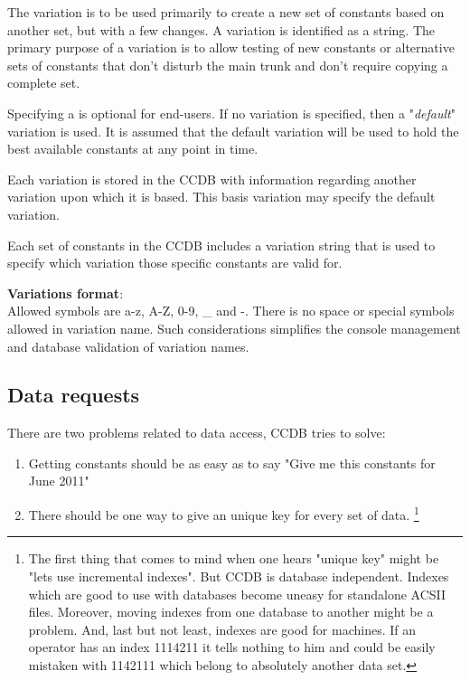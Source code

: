 \documentclass{article}
\begin{document}
The variation is to be used primarily to create a new set of constants based
on another set, but with a few changes. A variation is identified as a string.
The primary purpose of a variation is to allow testing of new constants or
alternative sets of constants that don't disturb the main trunk and don't
require copying a complete set.

Specifying a is optional for end-users. If no variation is specified, then a
"\textit{default}" variation is used. It is assumed that the default variation
will be used to hold the best available constants at any point in time.

Each variation is stored in the CCDB with information regarding another
variation upon which it is based. This basis variation may specify the default variation.

Each set of constants in the CCDB includes a variation string that is used to
specify which variation those specific constants are valid for.

\textbf{Variations format}:\\
Allowed symbols are a-z, A-Z, 0-9, \_ and -. There is no space or special symbols
allowed in variation name. Such considerations simplifies the console management
and database validation of variation names.


\subsection{Data requests}

There are two problems related to data access, CCDB tries to solve:
\begin{enumerate}
  \item Getting constants should be as easy as to say
        "Give me this constants for June 2011"

  \item There should be one way to give an unique key for every set of data.
  \footnote{
    The first thing that comes to mind when one hears "unique key" might be
    "lets use incremental indexes". But CCDB is database independent. Indexes
    which are good to use with databases become uneasy for standalone ACSII
    files. Moreover, moving indexes from one database to another might be a
    problem. And, last but not least, indexes are good for machines. If an
    operator has an index 1114211 it tells nothing to him and could be easily
    mistaken with 1142111 which belong to absolutely another data set.
  }
\end{enumerate}
\vspace{1 em}
\end{document}
